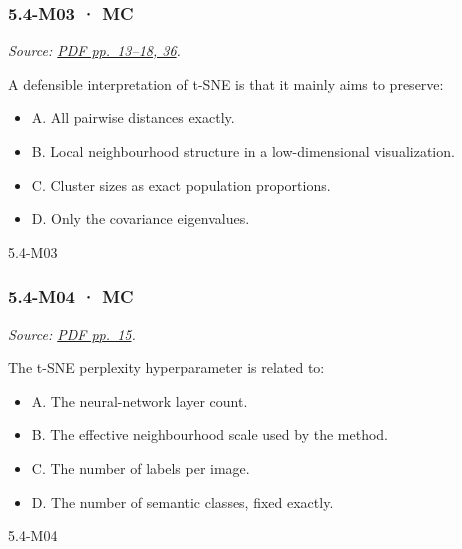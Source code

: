 \noindent\begin{minipage}{\linewidth}

\subsubsection{5.4-M03 · MC}\label{m03-mc-15}

\emph{Source:
\href{../Lecture\%20Slides/5.4.\%20Unsupervised\%20learning.pdf\#page=13}{PDF
pp.~13--18, 36}.}

A defensible interpretation of t-SNE is that it mainly aims to preserve:

\begin{itemize}
\tightlist
\item
  A. All pairwise distances exactly.
\item
  B. Local neighbourhood structure in a low-dimensional visualization.
\item
  C. Cluster sizes as exact population proportions.
\item
  D. Only the covariance eigenvalues.
\end{itemize}

\begin{solution}[8mm]{5.4-M03}

\end{solution}
\end{minipage}\par\medskip

\noindent\begin{minipage}{\linewidth}

\subsubsection{5.4-M04 · MC}\label{m04-mc-15}

\emph{Source:
\href{../Lecture\%20Slides/5.4.\%20Unsupervised\%20learning.pdf\#page=15}{PDF
pp.~15}.}

The t-SNE perplexity hyperparameter is related to:

\begin{itemize}
\tightlist
\item
  A. The neural-network layer count.
\item
  B. The effective neighbourhood scale used by the method.
\item
  C. The number of labels per image.
\item
  D. The number of semantic classes, fixed exactly.
\end{itemize}

\begin{solution}[8mm]{5.4-M04}

\end{solution}
\end{minipage}\par\medskip

